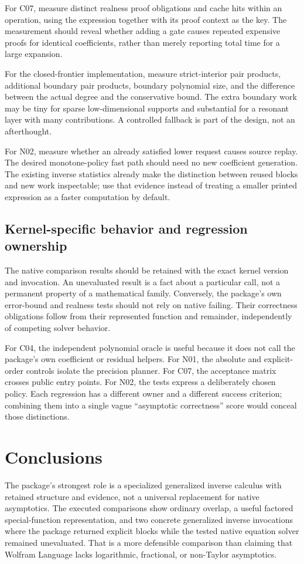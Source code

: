 \documentclass[11pt,letterpaper]{article}
\newcommand{\code}[1]{\texttt{\detokenize{#1}}}
\begin{document}
For C07, measure distinct realness proof obligations and cache hits within an operation, using the expression together with its proof context as the key. The measurement should reveal whether adding a gate causes repeated expensive proofs for identical coefficients, rather than merely reporting total time for a large expansion.

For the closed-frontier implementation, measure strict-interior pair products, additional boundary pair products, boundary polynomial size, and the difference between the actual degree and the conservative bound. The extra boundary work may be tiny for sparse low-dimensional supports and substantial for a resonant layer with many contributions. A controlled fallback is part of the design, not an afterthought.

For N02, measure whether an already satisfied lower request causes source replay. The desired monotone-policy fast path should need no new coefficient generation. The existing inverse statistics already make the distinction between reused blocks and new work inspectable; use that evidence instead of treating a smaller printed expression as a faster computation by default.\cite{repo-refinement}

\subsection{Kernel-specific behavior and regression ownership}
The native comparison results should be retained with the exact kernel version and invocation. An unevaluated \code{AsymptoticSolve} result is a fact about a particular call, not a permanent property of a mathematical family. Conversely, the package's own error-bound and realness tests should not rely on native \code{AsymptoticSolve} failing. Their correctness obligations follow from their represented function and remainder, independently of competing solver behavior.

For C04, the independent polynomial oracle is useful because it does not call the package's own coefficient or residual helpers. For N01, the absolute and explicit-order controls isolate the precision planner. For C07, the acceptance matrix crosses public entry points. For N02, the tests express a deliberately chosen policy. Each regression has a different owner and a different success criterion; combining them into a single vague ``asymptotic correctness'' score would conceal those distinctions.

\section{Conclusions}
The package's strongest role is a specialized generalized inverse calculus with retained structure and evidence, not a universal replacement for native asymptotics. The executed comparisons show ordinary overlap, a useful factored special-function representation, and two concrete generalized inverse invocations where the package returned explicit blocks while the tested native equation solver remained unevaluated. That is a more defensible comparison than claiming that Wolfram Language lacks logarithmic, fractional, or non-Taylor asymptotics.
\end{document}
